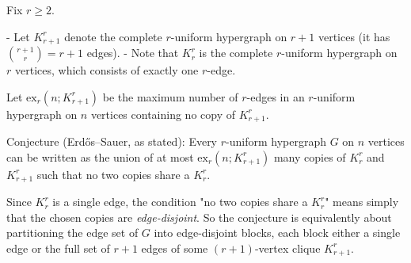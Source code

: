 Fix $r\ge 2$.

- Let $K_{r+1}^r$ denote the complete $r$-uniform hypergraph on $r+1$ vertices (it has $\binom{r+1}{r}=r+1$ edges).
- Note that $K_r^r$ is the complete $r$-uniform hypergraph on $r$ vertices, which consists of exactly one $r$-edge.

Let $\mathrm{ex}_r(n;K_{r+1}^r)$ be the maximum number of $r$-edges in an $r$-uniform hypergraph on $n$ vertices containing no copy of $K_{r+1}^r$.

Conjecture (Erd\H{o}s--Sauer, as stated): Every $r$-uniform hypergraph $G$ on $n$ vertices can be written as the union of at most $\mathrm{ex}_r(n;K_{r+1}^r)$ many copies of $K_r^r$ and $K_{r+1}^r$ such that no two copies share a $K_r^r$.

Since $K_r^r$ is a single edge, the condition "no two copies share a $K_r^r$" means simply that the chosen copies are \emph{edge-disjoint}.
So the conjecture is equivalently about partitioning the edge set of $G$ into edge-disjoint blocks, each block either a single edge or the full set of $r+1$ edges of some $(r+1)$-vertex clique $K_{r+1}^r$.
